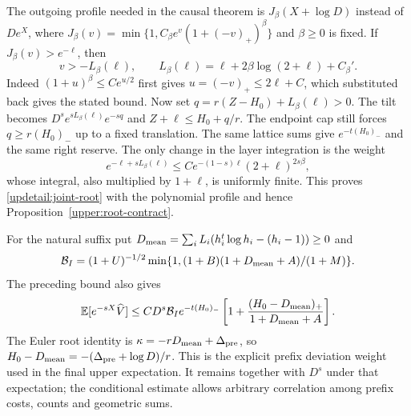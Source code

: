 The outgoing profile needed in the causal theorem is
$J_\beta(X+\log D)$ instead of $De^X$, where
$J_\beta(v)=\min\{1,C_\beta e^v(1+(-v)_+)^\beta\}$ and
$\beta\geq0$ is fixed. If $J_\beta(v)>e^{-\ell}$, then
\[
 v>-L_\beta(\ell),\qquad
 L_\beta(\ell)=\ell+2\beta\log(2+\ell)+C_\beta'.
\]
Indeed $(1+u)^\beta\leq Ce^{u/2}$ first gives
$u=(-v)_+\leq2\ell+C$, which substituted back gives the stated
bound. Now set $q=r(Z-H_0)+L_\beta(\ell)>0$. The tilt becomes
$D^se^{sL_\beta(\ell)}e^{-sq}$ and
$Z+\ell\leq H_0+q/r$. The endpoint cap still forces
$q\geq r(H_0)_-$ up to a fixed translation. The same lattice sums
give $e^{-t(H_0)_-}$ and the same right reserve. The only change in
the layer integration is the weight
\[
 e^{-\ell+sL_\beta(\ell)}
 \leq Ce^{-(1-s)\ell}(2+\ell)^{2s\beta},
\]
whose integral, also multiplied by $1+\ell$, is uniformly finite.
This proves \eqref{updetail:joint-root} with the polynomial profile
and hence Proposition~\ref{upper:root-contract}.

For the natural suffix put
$D_{\rm mean}=\sum_iL_i(h_i^t\log h_i-(h_i-1))\geq0$ and
\[
 \mathcal B_I=(1+U)^{-1/2}
 \min\{1,(1+B)(1+D_{\rm mean}+A)/(1+M)\}.
\]
The preceding bound also gives
\[
 \mathbb E[e^{-sX}\widehat V]
 \leq CD^s\mathcal B_Ie^{-t(H_0)_-}
 \left[1+\frac{(H_0-D_{\rm mean})_+}{1+D_{\rm mean}+A}\right].
\]
The Euler root identity is
$\kappa=-rD_{\rm mean}+\Delta_{\rm pre}$, so
$H_0-D_{\rm mean}=-(\Delta_{\rm pre}+\log D)/r$.
This is the explicit prefix deviation weight used in the final upper
expectation. It remains together with $D^s$ under that expectation;
the conditional estimate allows arbitrary correlation among prefix
costs, counts and geometric sums.
